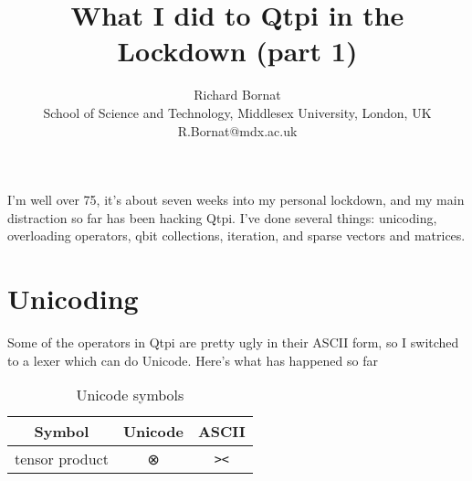 \documentclass[11pt,a4paper]{article}
\title{What I did to Qtpi in the Lockdown (part 1)}
\author{Richard Bornat \\ School of Science and Technology, Middlesex University, London, UK \\ R.Bornat@mdx.ac.uk}
\newcommand{\Symbol}[1]{{\fontspec{Apple Symbols}#1}}
\begin{document}
\maketitle

I'm well over 75, it's about seven weeks into my personal lockdown, and my main distraction so far has been hacking Qtpi. I've done several things: unicoding, overloading operators, qbit collections, iteration, and sparse vectors and matrices.

\section{Unicoding}

Some of the operators in Qtpi are pretty ugly in their ASCII form, so I switched to a lexer which can do Unicode. Here's what has happened so far

\begin{table}
\caption{Unicode symbols}
\centering
\begin{tabular}{|l|c|c|}
\hline 
\multicolumn{1}{|c|}{Symbol} & Unicode & ASCII \\
\hline
tensor product & \Symbol{⊗} & \texttt{><} \\
\hline
\end{tabular}
\label{unicodetable}
\end{table}




 
\end{document}
